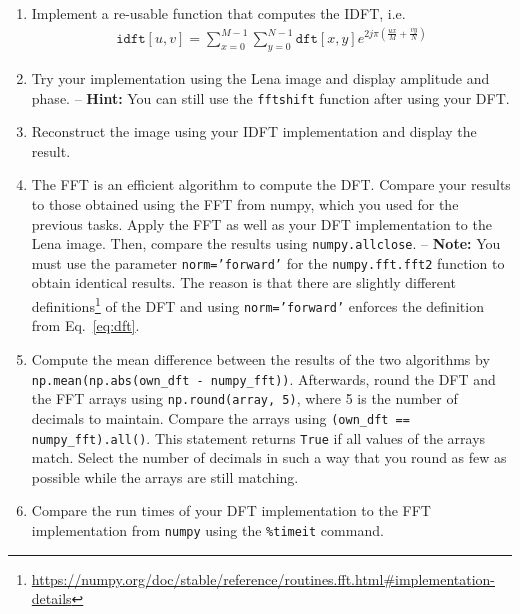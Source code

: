 \documentclass[12pt,a4paper]{article}
\begin{document}
\begin{enumerate}
\begin{samepage}
\begin{enumerate}
    \item Implement a re-usable function that computes the IDFT, i.e.
    \begin{gather}
        \texttt{idft}[u, v] = \sum_{x=0}^{M-1} \sum_{y=0}^{N-1} \texttt{dft}[x, y] e^{2j\pi (\frac{ux}{M}+\frac{vy}{N})}
    \end{gather}
    \item Try your implementation using the Lena image and display amplitude and phase. -- \textbf{Hint:} You can still use the \texttt{fftshift} function after using your DFT.
    \item Reconstruct the image using your IDFT implementation and display the result.
    \item The FFT is an efficient algorithm to compute the DFT. Compare your results to those obtained using the FFT from numpy, which you used for the previous tasks. Apply the FFT as well as your DFT implementation to the Lena image. Then, compare the results using \texttt{numpy.allclose}. -- \textbf{Note:} You must use the parameter \texttt{norm='forward'} for the \texttt{numpy.fft.fft2} function to obtain identical results. The reason is that there are slightly different definitions\footnote{\url{https://numpy.org/doc/stable/reference/routines.fft.html\#implementation-details}} of the DFT and using \texttt{norm='forward'} enforces the definition from Eq.~\eqref{eq:dft}.
    \item Compute the mean difference between the results of the two algorithms by \texttt{np.mean(np.abs(own\_dft - numpy\_fft))}. Afterwards, round the DFT and the FFT arrays using \texttt{np.round(array, 5)}, where 5 is the number of decimals to maintain.
    Compare the arrays using \texttt{(own\_dft == numpy\_fft).all()}. This statement returns \texttt{True} if all values of the arrays match. Select the number of decimals in such a way that you round as few as possible while the arrays are still matching.
    \item Compare the run times of your DFT implementation to the FFT implementation from \texttt{numpy} using the \texttt{\%timeit} command.
\end{enumerate}
\end{samepage}
\end{enumerate}
\end{document}
